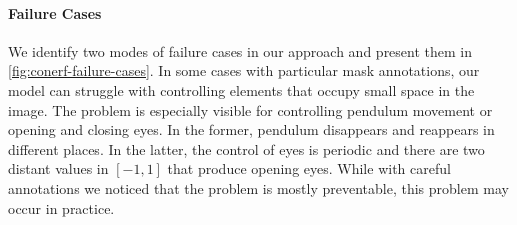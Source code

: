     \paragraph{Failure Cases}
      
      We identify two modes of failure cases in our approach and present them in
      \cref{fig:conerf-failure-cases}.
      In some cases with particular mask annotations, our model can struggle with
      controlling elements that occupy small space in the image.
      The problem is especially visible for controlling pendulum movement or opening
      and closing eyes.
      In the former, pendulum disappears and reappears in different places.
      In the latter, the control of eyes is periodic and there are two distant
      values in $[-1, 1]$ that produce opening eyes.
      While with careful annotations we noticed that the problem is mostly
      preventable, this problem may occur in practice.
